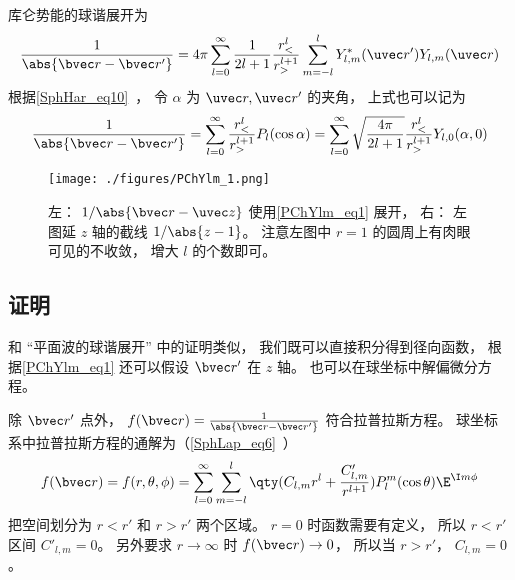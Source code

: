 
\begin{issues}
\issueDraft
\end{issues}


库仑势能的球谐展开为
\begin{equation}
\frac{1}{\abs{\bvec r - \bvec r'}} = 4\pi \sum_{l=0}^{\infty} \frac{1}{2l+1} \frac{r_<^l}{r_>^{l+1}} \sum_{m = -l}^l Y_{l,m}^*(\uvec r') Y_{l,m}(\uvec r)
\end{equation}
根据\autoref{SphHar_eq10}~， 令 $\alpha$ 为 $\uvec r, \uvec r'$ 的夹角， 上式也可以记为
\begin{equation}\label{PChYlm_eq1}
\frac{1}{\abs{\bvec r - \bvec r'}} = \sum_{l=0}^{\infty} \frac{r_<^l}{r_>^{l+1}} P_l(\cos\alpha) = \sum_{l=0}^{\infty} \sqrt{\frac{4\pi}{2l+1}} \frac{r_<^l}{r_>^{l+1}} Y_{l,0}(\alpha, 0)
\end{equation}

\begin{figure}[ht]
\centering
\texttt{[image: ./figures/PChYlm\_1.png]}
\caption{左： $1/\abs{\bvec r - \uvec z}$ 使用\autoref{PChYlm_eq1} 展开， 右： 左图延 $z$ 轴的截线 $1/\abs{z - 1}$。 注意左图中 $r = 1$ 的圆周上有肉眼可见的不收敛， 增大 $l$ 的个数即可。} \label{PChYlm_fig1}
\end{figure}

\subsection{证明}
和 “平面波的球谐展开” 中的证明类似， 我们既可以直接积分得到径向函数， 根据\autoref{PChYlm_eq1} 还可以假设 $\bvec r'$ 在 $z$ 轴。 也可以在球坐标中解偏微分方程。

除 $\bvec r'$ 点外， $f(\bvec r) = \frac{1}{\abs{\bvec r - \bvec r'}}$ 符合拉普拉斯方程。 球坐标系中拉普拉斯方程的通解为（\autoref{SphLap_eq6}~）
\begin{equation}
f(\bvec r) = f(r, \theta, \phi) = \sum_{l = 0}^\infty \sum_{m = -l}^l \qty(C_{l,m} r^l + \frac{C'_{l,m}}{r^{l+1}})P_l^m(\cos\theta)\E^{\I m\phi}
\end{equation}
把空间划分为 $r < r'$ 和 $r > r'$ 两个区域。 $r = 0$ 时函数需要有定义， 所以 $r < r'$ 区间 $C'_{l,m} = 0$。 另外要求 $r \to \infty$ 时 $f(\bvec r) \to 0$， 所以当 $r > r'$， $C_{l,m} = 0$。

